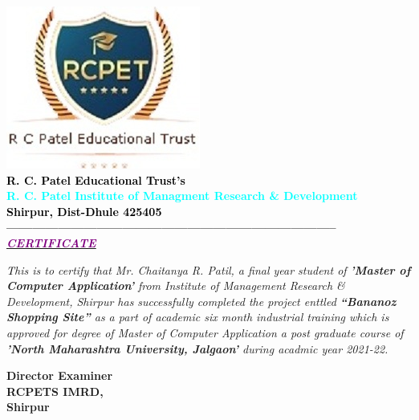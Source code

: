 \thispagestyle{empty}
\begin{center}
\includegraphics[scale=0.5]{Certi/111}\\[0.1cm]
\normalsize \bfseries \textcolor{black} {R. C. Patel Educational Trust's}\\[0.1cm]
\LARGE \bfseries \textcolor{cyan} {R. C. Patel Institute of Managment Research \& Development }\\[0.1cm]
\large \bfseries \textcolor{black} {Shirpur, Dist-Dhule 425405}\\[0.1cm]
----------------------------------------------------------------------------- \\[0.9cm]

\underline{\textit{\LARGE \textcolor{purple} {CERTIFICATE}}}\\[0.1cm]
\end{center}
\begin{flushleft}
\justifying
\begin{spacing}{2}


\textit{\large \textcolor{black}  This is to certify that Mr. Chaitanya R. Patil, a final year student of \textbf {'Master of Computer Application'} from Institute of Management Research \& Development, Shirpur has successfully completed the project enttled \textbf{``Bananoz Shopping Site''} as a part of academic six month industrial training which is approved for degree of Master of Computer Application a post graduate course of \textbf {'North Maharashtra University, Jalgaon'} during acadmic year 2021-22.}   \\[0.9cm]


\end{spacing}
\noindent
\textbf{Director \hspace{9cm} Examiner\\RCPETS IMRD,\\ Shirpur}\\[1.5cm]
\end{flushleft}
